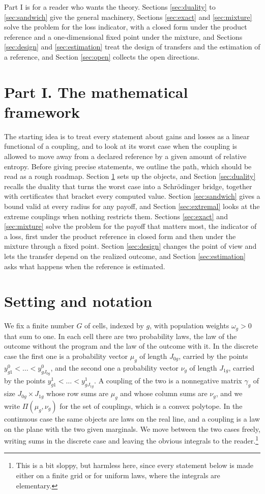 \documentclass[11pt,a4paper]{article}
\theoremstyle{notesplain}
\theoremstyle{notesupright}
\numberwithin{equation}{section}
\begin{document}
Part I is for a reader who wants the theory. Sections \ref{sec:duality} to \ref{sec:sandwich} give the general machinery, Sections \ref{sec:exact} and \ref{sec:mixture} solve the problem for the loss indicator, with a closed form under the product reference and a one-dimensional fixed point under the mixture, and Sections \ref{sec:design} and \ref{sec:estimation} treat the design of transfers and the estimation of a reference, and Section \ref{sec:open} collects the open directions.

\section*{Part I. The mathematical framework}
The starting idea is to treat every statement about gains and losses as a linear functional of a coupling, and to look at its worst case when the coupling is allowed to move away from a declared reference by a given amount of relative entropy. Before giving precise statements, we outline the path, which should be read as a rough roadmap. Section \ref{sec:setting} sets up the objects, and Section \ref{sec:duality} recalls the duality that turns the worst case into a Schrödinger bridge, together with certificates that bracket every computed value. Section \ref{sec:sandwich} gives a bound valid at every radius for any payoff, and Section \ref{sec:extremal} looks at the extreme couplings when nothing restricts them. Sections \ref{sec:exact} and \ref{sec:mixture} solve the problem for the payoff that matters most, the indicator of a loss, first under the product reference in closed form and then under the mixture through a fixed point. Section \ref{sec:design} changes the point of view and lets the transfer depend on the realized outcome, and Section \ref{sec:estimation} asks what happens when the reference is estimated.

\section{Setting and notation}
\label{sec:setting}
We fix a finite number $G$ of cells, indexed by $g$, with population weights $\omega_g>0$ that sum to one. In each cell there are two probability laws, the law of the outcome without the program and the law of the outcome with it. In the discrete case the first one is a probability vector $\mu_g$ of length $J_{0g}$, carried by the points $y^0_{g1}<\dots<y^0_{gJ_{0g}}$, and the second one a probability vector $\nu_g$ of length $J_{1g}$, carried by the points $y^1_{g1}<\dots<y^1_{gJ_{1g}}$. A coupling of the two is a nonnegative matrix $\gamma_g$ of size $J_{0g}\times J_{1g}$ whose row sums are $\mu_g$ and whose column sums are $\nu_g$, and we write $\Pi(\mu_g,\nu_g)$ for the set of couplings, which is a convex polytope. In the continuous case the same objects are laws on the real line, and a coupling is a law on the plane with the two given marginals. We move between the two cases freely, writing sums in the discrete case and leaving the obvious integrals to the reader.\footnote{This is a bit sloppy, but harmless here, since every statement below is made either on a finite grid or for uniform laws, where the integrals are elementary.}
\end{document}
